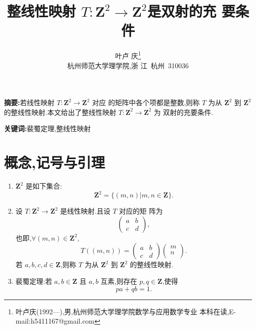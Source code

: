 \documentclass[twoside,11pt]{article}
\begin{document}
\title{\huge{\bf{整线性映射 $T:\mathbf{Z}^2\to \mathbf{Z}^2$是双射的充
      要条件 }}} \author{\small{叶卢
    庆\footnote{叶卢庆(1992---),男,杭州师范大学理学院数学与应用数学专业
      本科在读,E-mail:h5411167@gmail.com}}\\{\small{杭州师范大学理学院,浙
      江~杭州~310036}}} \date{}
\maketitle



\textbf{\small{摘要}:}若线性映射 $T:\mathbf{Z}^2\to \mathbf{Z}^2$ 对应
的矩阵中各个项都是整数,则称 $T$ 为从 $\mathbf{Z}^2$ 到 $\mathbf{Z}^2$
的整线性映射.本文给出了整线性映射 $T:\mathbf{Z}^2\to \mathbf{Z}^2$ 为
双射的充要条件.  \smallskip

\textbf{\small{关键词}:}裴蜀定理,整线性映射\smallskip


\vspace{30pt} %


\section{概念,记号与引理}
\label{sec:1}
\begin{enumerate}
\item $\mathbf{Z}^2$ 是如下集合:
$$
\mathbf{Z}^2=\{(m,n)|m,n\in \mathbf{Z}\}.
$$
\item 设 $T:\mathbf{Z}^2\to \mathbf{Z}^2$ 是线性映射.且设 $T$ 对应的矩
  阵为
$$
\begin{pmatrix}
  a&b\\
c&d
\end{pmatrix},
$$
也即,$\forall (m,n)\in \mathbf{Z}^2$,
$$
T((m,n))=\begin{pmatrix}
  a&b\\
c&d
\end{pmatrix}\begin{pmatrix}
  m\\
n\\
\end{pmatrix}.
$$
若 $a,b,c,d\in \mathbf{Z}$,则称 $T$ 为从 $\mathbf{Z}^2$ 到
$\mathbf{Z}^2$ 的整线性映射.
\item 裴蜀定理:若 $a,b\in \mathbf{Z}$ 且 $a,b$ 互素,则存在 $p,q\in
  \mathbf{Z}$,使得
$$
pa+qb=1.
$$
\end{enumerate}
\end{document}
